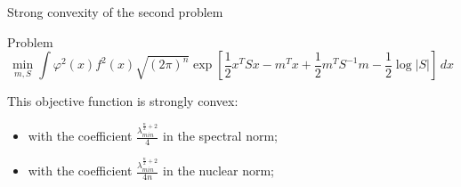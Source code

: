 \documentclass[10pt]{beamer}
\begin{document}
\begin{frame}{Strong convexity of the second problem}
\begin{block}{Problem}
\[
\min_{m,S} \int \varphi^2(x)f^2(x) \sqrt{(2\pi)^n} \exp \left[\frac12 x^TSx - m^Tx + \frac12 m^T S^{-1}m - \frac 12 \log |S|  \right] \, dx
\]
\end{block}

 This objective function is strongly convex:
\begin{itemize}
\item with the coefficient $\frac{\lambda_{min}^{\frac n2+ 2}}{4}$ in the spectral norm;
\item with the coefficient $\frac{\lambda_{min}^{\frac n2 + 2}}{4n}$ in the nuclear norm;
\end{itemize}
\end{frame}
\end{document}
